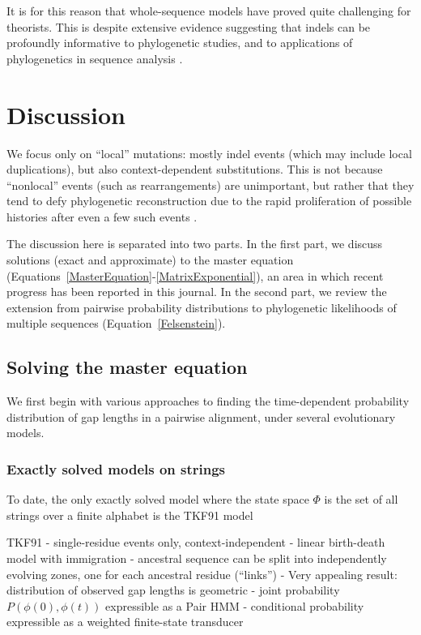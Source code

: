 \documentclass{bmcart}
\newcommand{\eqref}[1]{Equation~\ref{#1}}
\newcommand{\statespace}{\Phi}
\newcommand{\state}{\phi}
\begin{document}
It is for this reason that whole-sequence models have proved quite challenging for theorists.
This is despite extensive evidence suggesting that indels can be profoundly informative to phylogenetic studies,
and to applications of phylogenetics in sequence analysis \cite{pmid8445636,pmid15276848,pmid18578882,pmid23475937,pmid19958081,pmid16354754}.

\section*{Discussion}

We focus only on ``local'' mutations: mostly indel events (which may include local duplications),
but also context-dependent substitutions.
This is not because ``nonlocal'' events (such as rearrangements) are unimportant,
but rather that they tend to defy phylogenetic reconstruction due to the rapid proliferation of possible histories
after even a few such events \cite{pmid9773350}.

The discussion here is separated into two parts.
In the first part, we discuss solutions (exact and approximate)
to the master equation (Equations~\ref{MasterEquation}-\ref{MatrixExponential}),
an area in which recent progress has been reported in this journal.
In the second part, we review
the extension from pairwise probability distributions
to phylogenetic likelihoods of multiple sequences (\eqref{Felsenstein}).

\subsection*{Solving the master equation}

We first begin with various approaches to finding the time-dependent probability distribution
of gap lengths in a pairwise alignment,
under several evolutionary models.

\subsubsection*{Exactly solved models on strings}

To date, the only exactly solved model where the state space $\statespace$
is the set of all strings over a finite alphabet
is the TKF91 model \cite{ThorneEtal91}

TKF91
 - single-residue events only, context-independent
 - linear birth-death model with immigration
 - ancestral sequence can be split into independently evolving zones, one for each ancestral residue (``links'')
 - Very appealing result: distribution of observed gap lengths is geometric
 - joint probability $P(\state(0),\state(t))$ expressible as a Pair HMM \cite{HolmesBruno2001}
 - conditional probability expressible as a weighted finite-state transducer \cite{Holmes2003,WestessonEtAl2012,BouchardCote2013}
\end{document}
